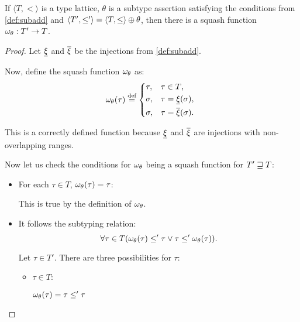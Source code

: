 \documentclass[main.tex]{subfiles}
\begin{document}
\begin{lemma}
    \label{lemma:subadd:squash}
    If $\langle T, \less \rangle$ is a type lattice, $\theta$
    is a subtype assertion satisfying the conditions from \cref{def:subadd}
    and $\langle T', \leq' \rangle = \langle T, \leq \rangle \oplus \theta$, then
    there is a squash function $\omega_{\theta} : T' \rightarrow T$.
\end{lemma}
\begin{proof}
    Let $\underline{\xi}$ and $\overline{\xi}$ be the injections from \cref{def:subadd}.

    Now, define the squash function $\omega_{\theta}$ as:
    \[
        \squash_{\theta}(\tau) \defeq
        \begin{cases*}
            \tau ,& $\tau \in T$, \\
            \sigma ,& $\tau = \subtyper{\xi}(\sigma)$, \\
            \sigma ,& $\tau = \suptyper{\xi}(\sigma)$. \\
        \end{cases*}
    \]

    This is a correctly defined function because $\underline{\xi}$ and
    $\overline{\xi}$ are injections with non-overlapping ranges.

    Now let us check the conditions for $\omega_{\theta}$
    being a squash function for $T' \sqsupseteq T$:

    \begin{itemize}
        \item For each $\tau \in T$, $\omega_{\theta}(\tau) = \tau$:

            This is true by the definition of $\omega_{\theta}$.

        \item It follows the subtyping relation:
            \[ \forall \tau \in T
                (\omega_{\theta}(\tau) \leq' \tau \lor \tau \leq' \omega_{\theta}(\tau)). \]

            Let $\tau \in T'$. There are three possibilities for $\tau$:
            \begin{itemize}
                \item $\tau \in T$:

                    $\omega_{\theta}(\tau) = \tau \leq' \tau$


\end{itemize}
\end{itemize}
\end{proof}
\end{document}
